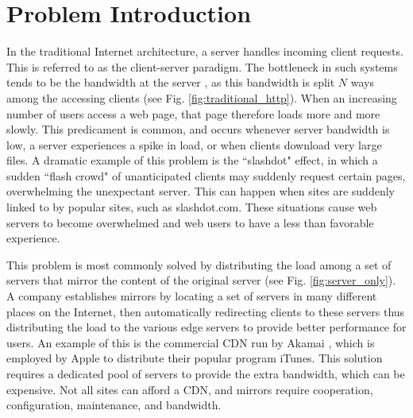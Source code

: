 \section {Problem Introduction}
In the traditional Internet architecture, a server handles incoming client requests.  This is referred to as the client-server paradigm.  The bottleneck in such systems tends to be the bandwidth at the server \cite{coopnet}, as this bandwidth is split $N$ ways among the accessing clients (see Fig. \ref{fig:traditional_http}).  When an increasing number of users access a web page, that page therefore loads more and more slowly.  This predicament is common, and occurs whenever server bandwidth is low, a server experiences a spike in load, or when clients download very large files.  A dramatic example of this problem is the ``slashdot" effect, in which a sudden ``flash crowd" of unanticipated clients may suddenly request certain pages, overwhelming the unexpectant server.  This can happen when sites are suddenly linked to by popular sites, such as slashdot.com.  These situations cause web servers to become overwhelmed and web users to have a less than favorable experience.

This problem is most commonly solved by distributing the load among a set of servers that mirror the content of the original server (see Fig. \ref{fig:server_only}).  A company establishes mirrors by locating a set of servers in many different places on the Internet, then automatically redirecting clients to these servers thus distributing the load to the various edge servers to provide better performance for users.  An example of this is the commercial CDN run by Akamai \cite{akamai}, which is employed by Apple to distribute their popular program iTunes\texttrademark.  This solution requires a dedicated pool of servers to provide the extra bandwidth, which can be expensive.  Not all sites can afford a CDN, and mirrors require cooperation, configuration, maintenance, and bandwidth.

